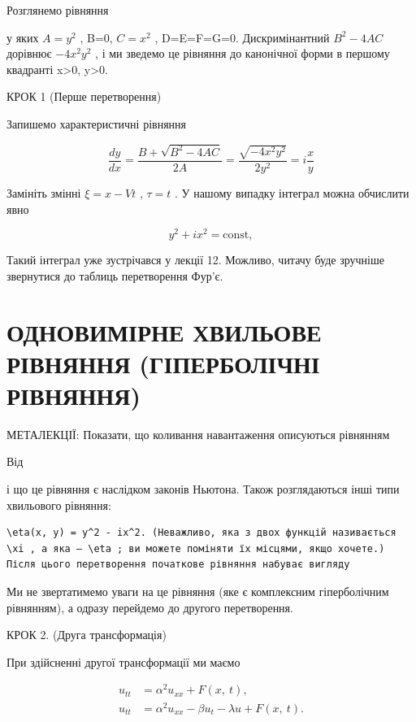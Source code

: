 \documentclass[
  ukrainian,
]{article}
\begin{document}
Розглянемо рівняння

у яких \(A=y^2\) , B=0, \(C=x^2\) , D=E=F=G=0. Дискримінантний
\(B^2-4AC\) дорівнює \(-4x^2y^2\) , і ми зведемо це рівняння до
канонічної форми в першому квадранті x\textgreater0, y\textgreater0.

КРОК 1 (Перше перетворення)

Запишемо характеристичні рівняння

\[
\frac{dy}{dx} = \frac{B + \sqrt{B^2 - 4AC}}{2A} = \frac{\sqrt{-4x^2y^2}}{2y^2} = i\frac{x}{y}
\]

Замініть змінні \(\xi = x - Vt\) , \(\tau = t\) . У нашому випадку
інтеграл можна обчислити явно

\[
y^2 + ix^2 = \text{const},
\]

Такий інтеграл уже зустрічався у лекції 12. Можливо, читачу буде
зручніше звернутися до таблиць перетворення Фур'є.

\section{ОДНОВИМІРНЕ ХВИЛЬОВЕ РІВНЯННЯ (ГІПЕРБОЛІЧНІ
РІВНЯННЯ)}\label{ux43eux434ux43dux43eux432ux438ux43cux456ux440ux43dux435-ux445ux432ux438ux43bux44cux43eux432ux435-ux440ux456ux432ux43dux44fux43dux43dux44f-ux433ux456ux43fux435ux440ux431ux43eux43bux456ux447ux43dux456-ux440ux456ux432ux43dux44fux43dux43dux44f}

МЕТАЛЕКЦІЇ: Показати, що коливання навантаження описуються рівнянням

Від

і що це рівняння є наслідком законів Ньютона. Також розглядаються інші
типи хвильового рівняння:

\begin{verbatim}
\eta(x, y) = y^2 - ix^2. (Неважливо, яка з двох функцій називається \xi , а яка — \eta ; ви можете поміняти їх місцями, якщо хочете.) Після цього перетворення початкове рівняння набуває вигляду
\end{verbatim}

Ми не звертатимемо уваги на це рівняння (яке є комплексним гіперболічним
рівнянням), а одразу перейдемо до другого перетворення.

КРОК 2. (Друга трансформація)

При здійсненні другої трансформації ми маємо

\[
\begin{split} u_{tt} &= \alpha^2 u_{xx} + F\left(x, \ t\right), \\ u_{tt} &= \alpha^2 u_{xx} - \beta u_t - \lambda u + F\left(x, \ t\right). \end{split}
\]
\end{document}

